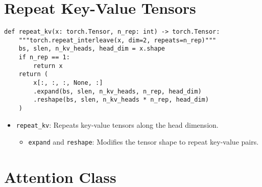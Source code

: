 \section{Repeat Key-Value Tensors}

\begin{lstlisting}
def repeat_kv(x: torch.Tensor, n_rep: int) -> torch.Tensor:
    """torch.repeat_interleave(x, dim=2, repeats=n_rep)"""
    bs, slen, n_kv_heads, head_dim = x.shape
    if n_rep == 1:
        return x
    return (
        x[:, :, :, None, :]
        .expand(bs, slen, n_kv_heads, n_rep, head_dim)
        .reshape(bs, slen, n_kv_heads * n_rep, head_dim)
    )
\end{lstlisting}

\begin{itemize}
    \item \texttt{repeat\_kv}: Repeats key-value tensors along the head dimension.
    \begin{itemize}
        \item \texttt{expand} and \texttt{reshape}: Modifies the tensor shape to repeat key-value pairs.
    \end{itemize}
\end{itemize}

\section{Attention Class}

